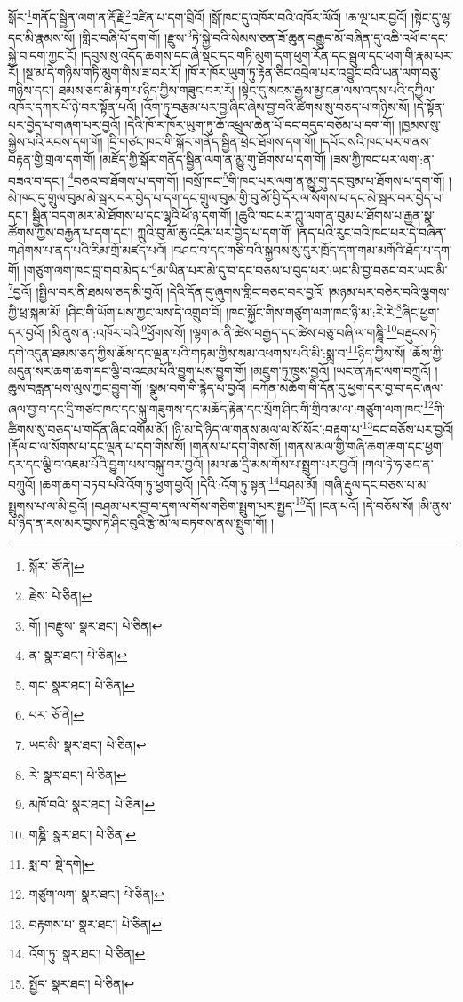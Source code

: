 སྒོར་\footnote{སྐོར་  ཅོ་ནེ། }གནོད་སྦྱིན་ལག་ན་རྡོ་རྗེ་\footnote{རྗེས་  པེ་ཅིན། }འཛིན་པ་དག་བྲིའོ། །སྒོ་ཁང་དུ་འཁོར་བའི་འཁོར་ལོའོ། །ཆ་ལྔ་པར་བྱའོ། །སྟེང་དུ་ལྷ་དང་མི་རྣམས་སོ། །གླིང་བཞི་པོ་དག་གོ། །རྫུས་\footnote{གོ། །བརྫུས་  སྣར་ཐང་།  པེ་ཅིན། }ཏེ་སྐྱེ་བའི་སེམས་ཅན་ཟོ་ཆུན་བརྒྱུད་མོ་བཞིན་དུ་འཆི་འཕོ་བ་དང་སྐྱེ་བ་དག་ཀྱང་ངོ། །དབུས་སུ་འདོད་ཆགས་དང་ཞེ་སྡང་དང་གཏི་མུག་དག་ཕུག་རོན་དང་སྦྲུལ་དང་ཕག་གི་རྣམ་པར་རོ། །སྔ་མ་དེ་གཉིས་གཏི་མུག་གིས་ཟ་བར་རོ། །ཁོ་ར་ཁོར་ཡུག་ཏུ་རྟེན་ཅིང་འབྲེལ་པར་འབྱུང་བའི་ཡན་ལག་བཅུ་གཉིས་དང་། ཐམས་ཅད་མི་རྟག་པ་ཉིད་ཀྱིས་གཟུང་བར་རོ། །སྟེང་དུ་སངས་རྒྱས་མྱ་ངན་ལས་འདས་པའི་དཀྱིལ་འཁོར་དཀར་པོ་ཉེ་བར་སྟོན་པའོ། །འོག་ཏུ་བརྩམ་པར་བྱ་ཞིང་ཞེས་བྱ་བའི་ཚིགས་སུ་བཅད་པ་གཉིས་སོ། །དེ་སྟོན་པར་བྱེད་པ་གཞག་པར་བྱའོ། །དེའི་ཁོ་ར་ཁོར་ཡུག་ཏུ་ཆོ་འཕྲུལ་ཆེན་པོ་དང་བདུད་བཅོམ་པ་དག་གོ། །ཁྱམས་སུ་སྐྱེས་པའི་རབས་དག་གོ། །དྲི་གཙང་ཁང་གི་སྒོར་གནོད་སྦྱིན་ཕྲེང་ཐོགས་དག་གོ། །དཔོང་སའི་ཁང་པར་གནས་བརྟན་གྱི་གྲལ་དག་གོ། །མཛོད་ཀྱི་སྒོར་གནོད་སྦྱིན་ལག་ན་མྱུ་གུ་ཐོགས་པ་དག་གོ། །ཟས་ཀྱི་ཁང་པར་ལག་:ན་བཟའ་བ་དང་། \footnote{ན་  སྣར་ཐང་།  པེ་ཅིན། }བཅའ་བ་ཐོགས་པ་དག་གོ། །བསྲོ་ཁང་\footnote{གང་  སྣར་ཐང་།  པེ་ཅིན། }གི་ཁང་པར་ལག་ན་མྱུ་གུ་དང་བུམ་པ་ཐོགས་པ་དག་གོ། །མེ་ཁང་དུ་གྲུལ་བུམ་མེ་སྦར་བར་བྱེད་པ་དག་དང་གྲུལ་བུམ་གྱི་བུ་མོ་བྱི་དོར་ལ་སོགས་པ་དང་མེ་སྦར་བར་བྱེད་པ་དང་། སྦྱིན་བདག་མར་མེ་ཐོགས་པ་དང་ལྷའི་ཕོ་ཉ་དག་གོ། །ཆུའི་ཁང་པར་ཀླུ་ལག་ན་བུམ་པ་ཐོགས་པ་རྒྱན་སྣ་ཚོགས་ཀྱིས་བརྒྱན་པ་དག་དང་། ཀླུའི་བུ་མོ་ཆུ་འདྲིམ་པར་བྱེད་པ་དག་གོ། །ནད་པའི་རུང་བའི་ཁང་པར་དེ་བཞིན་གཤེགས་པ་ནད་པའི་རིམ་གྲོ་མཛད་པའོ། །བཤང་བ་དང་གཅི་བའི་སྐྱབས་སུ་དུར་ཁྲོད་དག་གམ་མགོའི་ཐོད་པ་དག་གོ། །གཙུག་ལག་ཁང་བླ་གབ་མེད་པ་\footnote{པར་  ཅོ་ནེ། }མ་ཡིན་པར་མེ་དུ་བ་དང་བཅས་པ་བུད་པར་:ཡང་མི་བྱ་བཅང་བར་ཡང་མི་\footnote{ཡང་མི་  སྣར་ཐང་།  པེ་ཅིན། }བྱའོ། །སྤྱིལ་བར་ནི་ཐམས་ཅད་མི་བྱའོ། །དེའི་དོན་དུ་ཞུགས་གླིང་བཅང་བར་བྱའོ། །མཉམ་པར་བཅེར་བའི་ལྕགས་ཀྱི་ཕྲ་སྐམ་མོ། །ཤིང་གི་ཡོག་པས་ཀྱང་ལས་དེ་འགྲུབ་བོ། །ཁང་སྐྱོང་གིས་གཙུག་ལག་ཁང་ཉི་མ་:རེ་རེ་\footnote{རེ་  སྣར་ཐང་།  པེ་ཅིན། }ཞིང་ཕྱག་དར་བྱའོ། །མི་ནུས་ན་:འཁོར་བའི་\footnote{མཁོ་བའི་  སྣར་ཐང་།  པེ་ཅིན། }ཕྱོགས་སོ། །ལྷག་མ་ནི་ཚེས་བརྒྱད་དང་ཚེས་བཅུ་བཞི་ལ་གཎྜཱི་\footnote{གཎྜི་  སྣར་ཐང་།  པེ་ཅིན། }བརྡུངས་ཏེ་དགེ་འདུན་ཐམས་ཅད་ཀྱིས་ཆོས་དང་ལྡན་པའི་གཏམ་གྱིས་སམ་འཕགས་པའི་མི་:སྨྲ་བ་\footnote{སྨ་བ་  སྡེ་དགེ། }ཉིད་ཀྱིས་སོ། །ཆོས་ཀྱི་མདུན་སར་ཆག་ཆག་དང་ལྕི་བ་འཇམ་པོའི་བྱུག་པས་བྱུག་གོ། །མཇུག་ཏུ་ཁྲུས་བྱའོ། །ཡང་ན་རྐང་ལག་བཀྲུའོ། །ཆུས་བརླན་པས་ལུས་ཀྱང་བྱུག་གོ། །སྣུམ་བག་གི་རྙེད་པ་བྱའོ། །དཀོན་མཆོག་གི་དོན་དུ་ཕྱག་དར་བྱ་བ་དང་ཞལ་ཞལ་བྱ་བ་དང་དྲི་གཙང་ཁང་དང་སྐུ་གཟུགས་དང་མཆོད་རྟེན་དང་སྲོག་ཤིང་གི་གྲིབ་མ་ལ་:གཙུག་ལག་ཁང་\footnote{གཙུག་ལག་  སྣར་ཐང་།  པེ་ཅིན། }གི་ཚིགས་སུ་བཅད་པ་གདོན་ཞིང་འགོམ་མོ། །ཉི་མ་དེ་ཉིད་ལ་གནས་མལ་ལ་སོ་སོར་:བརྟག་པ་\footnote{བརྟགས་པ་  སྣར་ཐང་།  པེ་ཅིན། }དང་བཅོས་པར་བྱའོ། །རྡོལ་བ་ལ་སོགས་པ་དང་ལྡན་པ་དག་གིས་སོ། །གནས་པ་དག་གིས་སོ། །གནས་མལ་གྱི་གཞི་ཆག་ཆག་དང་ཕྱག་དར་དང་ལྕི་བ་འཇམ་པོའི་བྱུག་པས་བསྐུ་བར་བྱའོ། །མལ་ཆ་དྲི་མས་གོས་པ་སྤྲུག་པར་བྱའོ། །གལ་ཏེ་ཧ་ཅང་ན་བཀྲུའོ། །ཆག་ཆག་བཏབ་པའི་འོག་ཏུ་ཕྱག་བྱའོ། །དེའི་:འོག་ཏུ་སྟན་\footnote{འོག་ཏུ་  སྣར་ཐང་།  པེ་ཅིན། }བཤམ་མོ། །གཞི་རྡུལ་དང་བཅས་པ་མ་སྤྲུགས་པ་ལ་མི་བྱའོ། །བཤམ་པར་བྱ་བ་དག་ལ་གོས་གཅིག་སྤྲུག་པར་སྤྱད་\footnote{སྤྱོད་  སྣར་ཐང་།  པེ་ཅིན། }དོ། །ངན་པའོ། །དེ་བཅོས་སོ། །མི་ནུས་པ་ཉིད་ན་རས་མར་བྱས་ཏེ་ཤིང་བུའི་རྩེ་མོ་ལ་བཏགས་ནས་སྤྲུག་གོ། །
